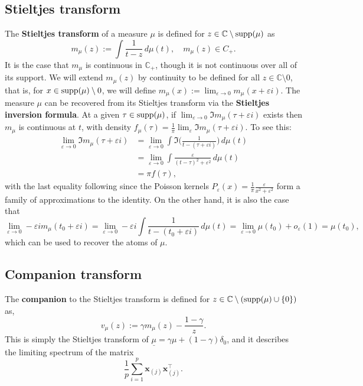 \documentclass{article}
\newcommand{\bx}{\boldsymbol{x}}
\newcommand{\Complex}{\mathbb{C}}
\begin{document}
\subsection{Stieltjes transform}
The {\bf Stieltjes transform} of a measure $\mu$ is defined for $z \in \mathbb{C}\setminus\mathrm{supp}(\mu)$ as
$$
m_{\mu}(z) := \int \frac{1}{t - z} \,d\mu(t), \quad m_{\mu}(z) \in C_{+}.
$$
It is the case that $m_{\mu}$ is continuous in $\Complex_{+}$, though it is not continuous over all of its support. We will extend $m_{\mu}(z)$ by continuity to be defined for all $z \in \mathbb{C} \setminus0$, that is, for $x \in \mathrm{supp}(\mu) \setminus 0$, we will define $m_{\mu}(x) := \lim_{\varepsilon \to 0} m_{\mu}(x + \varepsilon i)$. 
The measure $\mu$ can be recovered from its Stieltjes transform via the {\bf Stieltjes inversion formula}. At a given $\tau \in \mathrm{supp}(\mu)$, if $\lim_{\varepsilon \to 0} \Im m_{\mu}(\tau + \varepsilon i)$ exists then $m_{\mu}$ is continuous at $t$, with density $f_{\mu}(\tau) = \frac{1}{\pi}\lim_{\varepsilon} \Im m_{\mu}(\tau + \varepsilon i)$. To see this:
\begin{align*}
	\lim_{\varepsilon \to 0}\Im m_{\mu}(\tau + \varepsilon i) 
	& = 
	\lim_{\varepsilon \to 0}\int \Im\Big(\frac{1}{t - (\tau + \varepsilon i)}\Big) \,d\mu(t) \\
	& = \lim_{\varepsilon \to 0} \int \frac{\varepsilon}{(t - \tau)^2 + \varepsilon^2} \,d\mu(t) \\
	& = \pi f(\tau),
\end{align*} 
with the last equality following since the Poisson kernels $P_{\varepsilon}(x) = \frac{1}{\pi} \frac{\varepsilon}{x^2 + \varepsilon^2}$ form a family of approximations to the identity. On the other hand, it is also the case that
$$
\lim_{\varepsilon \to 0} - \varepsilon i m_{\mu}(t_0 + \varepsilon i) 
= \lim_{\varepsilon \to 0} - \varepsilon i \int \frac{1}{t - (t_0 + \varepsilon i)} \,d\mu(t)
= \lim_{\varepsilon \to 0} \mu(t_0) + o_{\varepsilon}(1)
= \mu(t_0),
$$  
which can be used to recover the atoms of $\mu$.

\subsection{Companion transform}
The {\bf companion} to the Stieltjes transform is defined for $z \in \mathbb{C} \setminus (\mathrm{supp}(\mu) \cup \{0\})$ as,
$$
v_{\mu}(z) := \gamma m_{\mu}(z) - \frac{1 - \gamma}{z}.
$$
This is simply the Stieltjes transform of $\underline{\mu} = \gamma \mu + (1 - \gamma) \delta_{0}$, and it describes the limiting spectrum of the matrix
$$
\frac{1}{p} \sum_{i = 1}^{p} \bx_{(j)} \bx_{(j)}^{\top}.
$$
\end{document}
